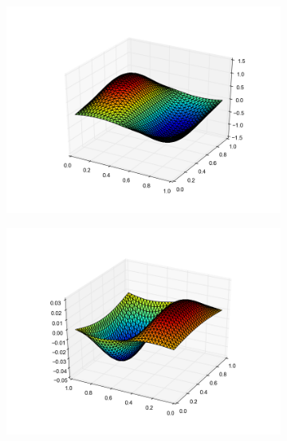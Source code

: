 %
\begin{figure}[h!]
  \centering
  \begin{subfigure}[b]{0.48\textwidth}
     \includegraphics[width=\textwidth, trim={2.5cm 1.25cm 2.5cm 2cm}, clip]{./Figures/surfplot_key2_5.png}
  \end{subfigure}%
  \quad
  \begin{subfigure}[b]{0.48\textwidth}
    \includegraphics[width=\textwidth, trim={2.5cm 1.25cm 2.5cm 2cm}, clip]{./Figures/surfplot_key3_5.png}
  \end{subfigure}
  \quad
  \begin{subfigure}[b]{0.48\textwidth}

\end{subfigure}
\end{figure}
